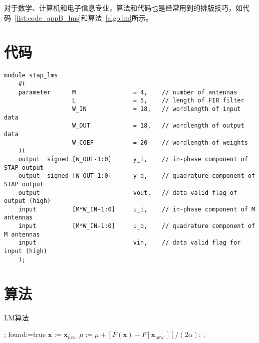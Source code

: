 \setcounter{chapter}{2}
对于数学、计算机和电子信息专业，算法和代码也是经常用到的排版技巧，如代码~\ref{list:code_appB_lms}和算法~\ref{algo:lm}所示。
\section{代码}
{\fontsize{10pt}{0.5\baselineskip}\selectfont
	\begin{lstlisting}[caption={空时~LMS~算法~Verilog~模块端口声明},label={list:code_appB_lms}]
	module stap_lms
	#(
	parameter      M                = 4,    // number of antennas
	               L                = 5,    // length of FIR filter
	               W_IN             = 18,   // wordlength of input data
	               W_OUT            = 18,   // wordlength of output data
	               W_COEF           = 20    // wordlength of weights
	)(
	output  signed [W_OUT-1:0]      y_i,    // in-phase component of STAP output
	output  signed [W_OUT-1:0]      y_q,    // quadrature component of STAP output
	output                          vout,   // data valid flag of output (high)
	input          [M*W_IN-1:0]     u_i,    // in-phase component of M antennas
	input          [M*W_IN-1:0]     u_q,    // quadrature component of M antennas
	input                           vin,    // data valid flag for input (high)
	);
	\end{lstlisting}
}
\section{算法}
\begin{algorithm}[!ht]  
    \caption{ LM算法}
    \label{algo:lm}
    \begin{algorithmic}[1]  
      ;
            \State found:=true
        \Else
                \State $\mathbf{x}:=\mathbf{x}_{new}$
            \Else
                \State $\mu:=\mu+\left[F(\mathbf{x})-F\left[\mathbf{x}_{\text {new }}\right]\right] /(2 \alpha)$;
            \EndIf
        \EndIf
      \EndWhile;
    \end{algorithmic}  
\end{algorithm}